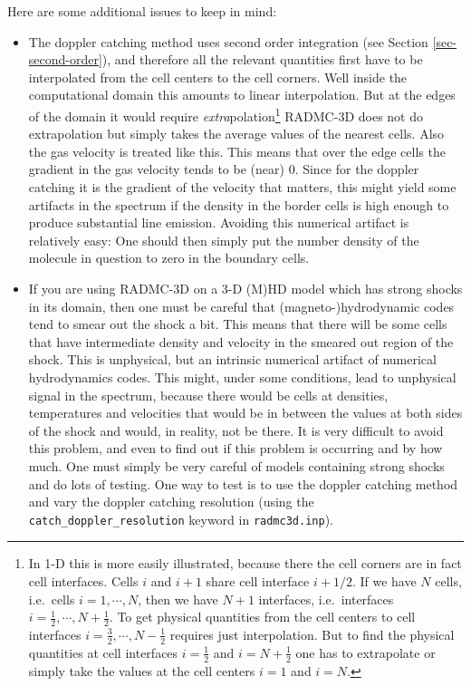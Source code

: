 \documentclass{report}
\begin{document}
Here are some additional issues to keep in mind:
\begin{itemize}
\item The doppler catching method uses second order integration (see Section
  \ref{sec-second-order}), and therefore all the relevant quantities first
  have to be interpolated from the cell centers to the cell corners. Well
  inside the computational domain this amounts to linear interpolation. But
  at the edges of the domain it would require {\em
    extra}polation\footnote{In 1-D this is more easily illustrated, because
    there the cell corners are in fact cell interfaces. Cells $i$ and $i+1$
    share cell interface $i+1/2$. If we have $N$ cells, i.e.\ cells
    $i=1,\cdots,N$, then we have $N+1$ interfaces, i.e.\ interfaces
    $i=\tfrac{1}{2},\cdots,N+\tfrac{1}{2}$. To get physical quantities from
    the cell centers to cell interfaces
    $i=\tfrac{3}{2},\cdots,N-\tfrac{1}{2}$ requires just interpolation. But
    to find the physical quantities at cell interfaces $i=\tfrac{1}{2}$ and
    $i=N+\tfrac{1}{2}$ one has to extrapolate or simply take the values at
    the cell centers $i=1$ and $i=N$.} RADMC-3D does not do
  extrapolation but simply takes the average values of the nearest
  cells. Also the gas velocity is treated like this. This means that over
  the edge cells the gradient in the gas velocity tends to be (near)
  0. Since for the doppler catching it is the gradient of the velocity that
  matters, this might yield some artifacts in the spectrum if the density in
  the border cells is high enough to produce substantial line
  emission. Avoiding this numerical artifact is relatively easy: One should
  then simply put the number density of the molecule in question to zero in
  the boundary cells.
\item If you are using RADMC-3D on a 3-D (M)HD model which has strong shocks
  in its domain, then one must be careful that (magneto-)hydrodynamic codes
  tend to smear out the shock a bit. This means that there will be some
  cells that have intermediate density and velocity in the smeared out
  region of the shock. This is unphysical, but an intrinsic numerical
  artifact of numerical hydrodynamics codes. This might, under some
  conditions, lead to unphysical signal in the spectrum, because there would
  be cells at densities, temperatures and velocities that would be in
  between the values at both sides of the shock and would, in reality, not
  be there. It is very difficult to avoid this problem, and even to find out
  if this problem is occurring and by how much. One must simply be very
  careful of models containing strong shocks and do lots of testing.  One
  way to test is to use the doppler catching method and vary the doppler
  catching resolution (using the {\small\tt catch\_doppler\_resolution}
  keyword in {\small\tt radmc3d.inp}).
\end{itemize}
\end{document}

